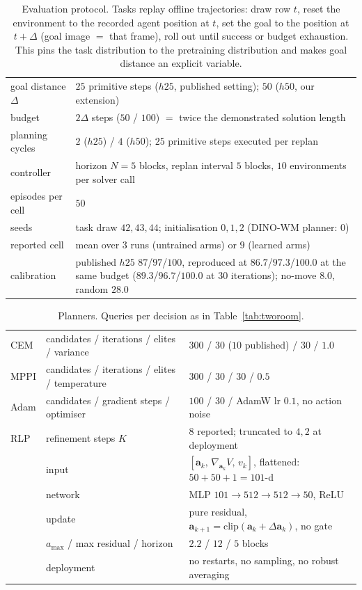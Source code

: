 \begin{table}[h]
\centering\small
\caption{Evaluation protocol. Tasks replay offline trajectories: draw row
$t$, reset the environment to the recorded agent position at $t$, set the
goal to the position at $t+\Delta$ (goal image $=$ that frame), roll out
until success or budget exhaustion. This pins the task distribution to the
pretraining distribution and makes goal distance an explicit variable.}
\begin{tabular}{ll}
\toprule
goal distance $\Delta$ & $25$ primitive steps ($h25$, published setting); $50$ ($h50$, our extension) \\
budget & $2\Delta$ steps ($50$ / $100$) $=$ twice the demonstrated solution length \\
planning cycles & $2$ ($h25$) / $4$ ($h50$); $25$ primitive steps executed per replan \\
controller & horizon $N{=}5$ blocks, replan interval $5$ blocks, $10$ environments per solver call \\
episodes per cell & $50$ \\
seeds & task draw $42,43,44$; initialisation $0,1,2$ (DINO-WM planner: $0$) \\
reported cell & mean over $3$ runs (untrained arms) or $9$ (learned arms) \\
calibration & published $h25$ $87$/$97$/$100$, reproduced at
              $86.7$/$97.3$/$100.0$ at the same budget ($89.3$/$96.7$/$100.0$ at
              $30$ iterations); no-move $8.0$, random $28.0$ \\
\bottomrule
\end{tabular}
\end{table}

\begin{table}[h]
\centering\small
\caption{Planners. Queries per decision as in Table~\ref{tab:tworoom}.}
\begin{tabular}{lll}
\toprule
CEM & candidates / iterations / elites / variance & $300$ / $30$ ($10$ published) / $30$ / $1.0$ \\
MPPI & candidates / iterations / elites / temperature & $300$ / $30$ / $30$ / $0.5$ \\
Adam & candidates / gradient steps / optimiser & $100$ / $30$ / AdamW lr $0.1$, no action noise \\
\midrule
RLP & refinement steps $K$ & $8$ reported; truncated to $4,2$ at deployment \\
    & input & $[\mathbf a_k,\, \nabla_{\!\mathbf a_k}V,\, v_k]$, flattened: $50 + 50 + 1 = 101$-d \\
    & network & MLP $101 \to 512 \to 512 \to 50$, ReLU \\
    & update & pure residual, $\mathbf a_{k+1} = \mathrm{clip}(\mathbf a_k + \Delta\mathbf a_k)$, no gate \\
    & $a_{\max}$ / max residual / horizon & $2.2$ / $12$ / $5$ blocks \\
    & deployment & no restarts, no sampling, no robust averaging \\
\bottomrule
\end{tabular}
\end{table}

